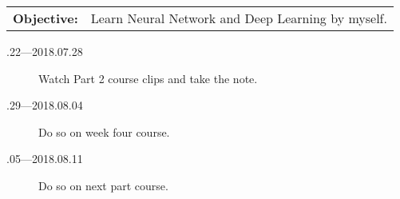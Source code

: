 \documentclass[a4paper]{article}
\begin{document}
\begin{tabular}{rl}
	\textbf{Objective:} & Learn Neural Network and Deep Learning by myself. \\
\end{tabular}

\begin{description}
    \item[.22---2018.07.28] Watch Part 2 course clips and take the note.
    \item[.29---2018.08.04] Do so on week four course.
    \item[.05---2018.08.11] Do so on next part course.
\end{description}



\end{document}
